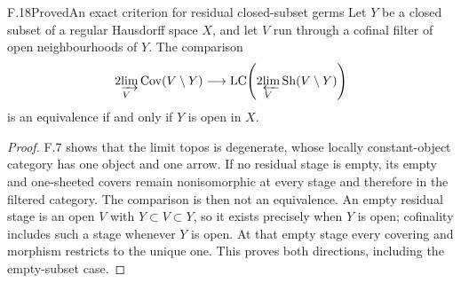 \begin{statement}{F.18}{Proved}{An exact criterion for residual closed-subset germs}
Let $Y$ be a closed subset of a regular Hausdorff space $X$, and
let $V$ run through a cofinal filter of open neighbourhoods of
$Y$. The comparison
\[
 \operatorname*{2\!\varinjlim}_V\operatorname{Cov}(V\setminus Y)
 \longrightarrow
 \operatorname{LC}\!\left(
     \operatorname*{2\!\varprojlim}_V\operatorname{Sh}(V\setminus Y)
                 \right)
\]
is an equivalence if and only if $Y$ is open in $X$.
\end{statement}
\begin{proof}
F.7 shows that the limit topos is degenerate, whose locally
constant-object category has one object and one arrow. If no
residual stage is empty, its empty and one-sheeted covers remain
nonisomorphic at every stage and therefore in the filtered
category. The comparison is then not an equivalence. An empty
residual stage is an open $V$ with $Y\subset V\subset Y$,
so it exists precisely when $Y$ is open; cofinality includes such
a stage whenever $Y$ is open. At that empty stage every covering
and morphism restricts to the unique one. This proves both
directions, including the empty-subset case.
\end{proof}

